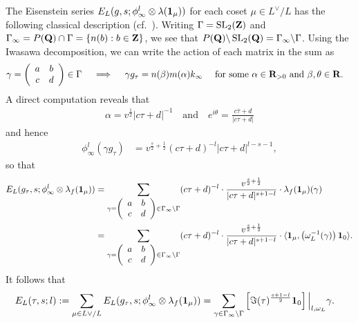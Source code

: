 \documentclass{amsart}
\theoremstyle{definition}
\theoremstyle{definition}
\theoremstyle{definition}
\begin{document}
The Eisenstein series $E_L(g, s; \phi_{\infty}^l \otimes \lambda({\bf{1}}_{\mu}))$ for each coset $\mu \in L^{\vee}/L$ has the following classical description (cf.~\cite[$\S$2.2]{BY}).
Writing $\Gamma = \operatorname{SL}_2({\bf{Z}})$ and $\Gamma_{\infty} = P({\bf{Q}}) \cap \Gamma = \lbrace n(b): b \in {\bf{Z}} \rbrace$,
we see that $P({\bf{Q}}) \backslash \operatorname{SL}_2({\bf{Q}}) = \Gamma_{\infty} \backslash \Gamma$. 
Using the Iwasawa decomposition, we can write the action of each matrix in the sum as 
\begin{align*} \gamma = \left( \begin{array}{cc} a & b \\ c & d \end{array} \right) \in \Gamma  \quad \implies \quad
\gamma g_{\tau} = n(\beta) m(\alpha) k_{\infty} \quad &\text{  for some $\alpha \in {\bf{R}}_{>0}$ and $\beta, \theta \in {\bf{R}}$.}\end{align*}
A direct computation reveals that 
\begin{align*} \alpha = v^{\frac{1}{2}} \vert c \tau + d \vert^{-1} \quad \text{and} \quad e^{i \theta} = \frac{ c \overline{\tau} + d }{ \vert c \tau + d \vert }\end{align*}
and hence 
\begin{align*} \phi_{\infty}^l(\gamma g_{\tau}) &= v^{\frac{s}{2} + \frac{1}{2}} (c \tau + d)^{-l} \vert c \tau + d \vert^{l - s- 1}, \end{align*}
so that  
\begin{equation*}\begin{aligned} E_L(g_{\tau}, s; \phi_{\infty}^l \otimes \lambda_f({\bf{1}}_{\mu})) &= 
\sum\limits_{  \gamma = \left( \begin{array}{cc} a & b \\ c & d \end{array} \right) \in \Gamma_{\infty} \backslash \Gamma } (c \tau + d)^{-l} \cdot
\frac{ v^{\frac{s}{2} + \frac{1}{2}}  }{ \vert c \tau + d \vert^{s + 1 - l}   } \cdot \lambda_f({\bf{1}}_{\mu})(\gamma) \\
&= \sum\limits_{  \gamma = \left( \begin{array}{cc} a & b \\ c & d \end{array} \right) \in \Gamma_{\infty} \backslash \Gamma } (c \tau + d)^{-l} \cdot
\frac{ v^{\frac{s}{2} + \frac{1}{2}}  }{ \vert c \tau + d \vert^{s + 1 - l}   } 
\cdot \langle {\bf{1}}_{\mu}, \left( \omega_L^{-1}(\gamma)\right) {\bf{1}}_0  \rangle.\end{aligned}\end{equation*}
It follows that 
\begin{align}\label{E-classical} E_L(\tau, s; l) := \sum\limits_{ \mu \in L{\vee}/L} E_L(g_{\tau}, s; \phi_{\infty}^l \otimes \lambda_f({\bf{1}}_{\mu}))
&= \sum\limits_{ \gamma \in \Gamma_{\infty} \backslash \Gamma } \left[ \Im(\tau)^{\frac{s + 1 - l}{2}} {\bf{1}}_0 \right] \Big\vert_{l, \omega_{L}} \gamma. \end{align}
\end{document}
